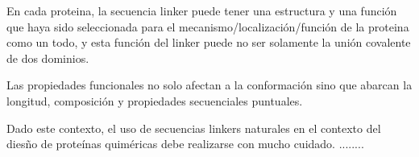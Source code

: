 En cada proteina, la secuencia linker puede tener una estructura y una función que haya sido seleccionada para el mecanismo/localización/función de la proteina como un todo, 
y esta función del linker puede no ser solamente la unión covalente de dos dominios. 

Las propiedades funcionales no solo afectan a la conformación sino que abarcan la longitud, composición y propiedades secuenciales puntuales.





Dado este contexto, el uso de secuencias linkers naturales en el contexto del diesño de proteínas quiméricas debe realizarse con mucho cuidado.
........













